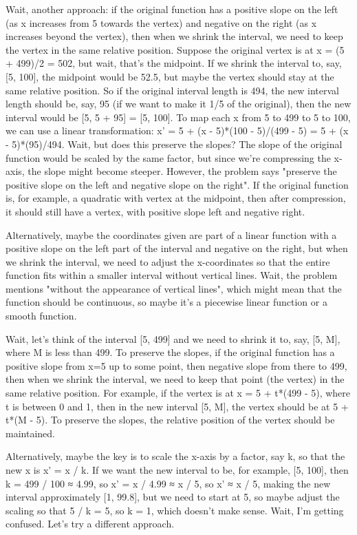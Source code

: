 Wait, another approach: if the original function has a positive slope on the left (as x increases from 5 towards the vertex) and negative on the right (as x increases beyond the vertex), then when we shrink the interval, we need to keep the vertex in the same relative position. Suppose the original vertex is at x = (5 + 499)/2 = 502, but wait, that's the midpoint. If we shrink the interval to, say, [5, 100], the midpoint would be 52.5, but maybe the vertex should stay at the same relative position. So if the original interval length is 494, the new interval length should be, say, 95 (if we want to make it 1/5 of the original), then the new interval would be [5, 5 + 95] = [5, 100]. To map each x from 5 to 499 to 5 to 100, we can use a linear transformation: x' = 5 + (x - 5)*(100 - 5)/(499 - 5) = 5 + (x - 5)*(95)/494. Wait, but does this preserve the slopes? The slope of the original function would be scaled by the same factor, but since we're compressing the x-axis, the slope might become steeper. However, the problem says "preserve the positive slope on the left and negative slope on the right". If the original function is, for example, a quadratic with vertex at the midpoint, then after compression, it should still have a vertex, with positive slope left and negative right. 

Alternatively, maybe the coordinates given are part of a linear function with a positive slope on the left part of the interval and negative on the right, but when we shrink the interval, we need to adjust the x-coordinates so that the entire function fits within a smaller interval without vertical lines. Wait, the problem mentions "without the appearance of vertical lines", which might mean that the function should be continuous, so maybe it's a piecewise linear function or a smooth function. 

Wait, let's think of the interval [5, 499] and we need to shrink it to, say, [5, M], where M is less than 499. To preserve the slopes, if the original function has a positive slope from x=5 up to some point, then negative slope from there to 499, then when we shrink the interval, we need to keep that point (the vertex) in the same relative position. For example, if the vertex is at x = 5 + t*(499 - 5), where t is between 0 and 1, then in the new interval [5, M], the vertex should be at 5 + t*(M - 5). To preserve the slopes, the relative position of the vertex should be maintained. 

Alternatively, maybe the key is to scale the x-axis by a factor, say k, so that the new x is x' = x / k. If we want the new interval to be, for example, [5, 100], then k = 499 / 100 ≈ 4.99, so x' = x / 4.99 ≈ x / 5, so x' ≈ x / 5, making the new interval approximately [1, 99.8], but we need to start at 5, so maybe adjust the scaling so that 5 / k = 5, so k = 1, which doesn't make sense. Wait, I'm getting confused. Let's try a different approach. 

